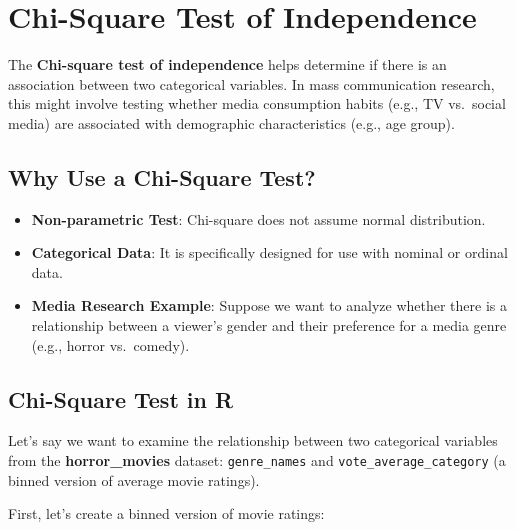 \documentclass[
]{book}
\providecommand{\tightlist}{%
  \setlength{\itemsep}{0pt}\setlength{\parskip}{0pt}}
\begin{document}
\section{Chi-Square Test of Independence}\label{chi-square-test-of-independence}

The \textbf{Chi-square test of independence} helps determine if there is an association between two categorical variables. In mass communication research, this might involve testing whether media consumption habits (e.g., TV vs.~social media) are associated with demographic characteristics (e.g., age group).

\subsection*{Why Use a Chi-Square Test?}\label{why-use-a-chi-square-test}

\begin{itemize}
\tightlist
\item
  \textbf{Non-parametric Test}: Chi-square does not assume normal distribution.
\item
  \textbf{Categorical Data}: It is specifically designed for use with nominal or ordinal data.
\item
  \textbf{Media Research Example}: Suppose we want to analyze whether there is a relationship between a viewer's gender and their preference for a media genre (e.g., horror vs.~comedy).
\end{itemize}

\subsection*{Chi-Square Test in R}\label{chi-square-test-in-r}

Let's say we want to examine the relationship between two categorical variables from the \textbf{horror\_movies} dataset: \texttt{genre\_names} and \texttt{vote\_average\_category} (a binned version of average movie ratings).

First, let's create a binned version of movie ratings:
\end{document}
